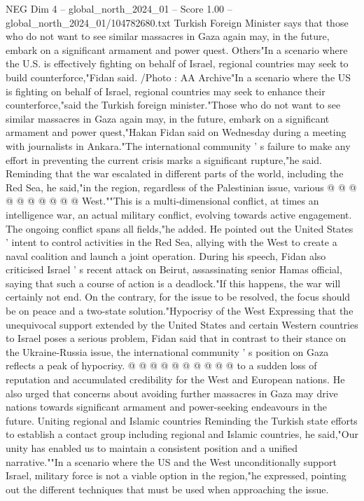 \begin{textsample}{NEG Dim 4 – global\_north\_2024\_01 – Score 1.00 – global\_north\_2024\_01/104782680.txt}  \label{ex:f4_neg_128}
Turkish Foreign Minister says that those who do not want to see similar massacres in Gaza again may, in the future, embark on a significant armament and power quest.
Others"In a scenario where the U.S. is effectively fighting on behalf of Israel, regional countries may seek to build counterforce,"Fidan said. /Photo : AA Archive"In a scenario where the US is fighting on behalf of Israel, regional countries may seek to enhance their counterforce,"said the Turkish foreign minister."Those who do not want to see similar massacres in Gaza again may, in the future, embark on a significant armament and power quest,"Hakan Fidan said on Wednesday during a meeting with journalists in Ankara."The international community ' s failure to make any effort in preventing the current crisis marks a significant rupture,"he said.
Reminding that the war escalated in different parts of the world, including the Red Sea, he said,"in the region, regardless of the Palestinian issue, various @ @ @ @ @ @ @ @ @ @ West.""This is a multi-dimensional conflict, at times an intelligence war, an actual military conflict, evolving towards active engagement.
The ongoing conflict spans all fields,"he added.
He pointed out the United States ' intent to control activities in the Red Sea, allying with the West to create a naval coalition and launch a joint operation.
During his speech, Fidan also criticised Israel ' s recent attack on Beirut, assassinating senior Hamas official, saying that such a course of action is a deadlock."If this happens, the war will certainly not end.
On the contrary, for the issue to be resolved, the focus should be on peace and a two-state solution."Hypocrisy of the West Expressing that the unequivocal support extended by the United States and certain Western countries to Israel poses a serious problem, Fidan said that in contrast to their stance on the Ukraine-Russia issue, the international community ' s position on Gaza reflects a peak of hypocrisy. @ @ @ @ @ @ @ @ @ @ to a sudden loss of reputation and accumulated credibility for the West and European nations.
He also urged that concerns about avoiding further massacres in Gaza may drive nations towards significant armament and power-seeking endeavours in the future.
Uniting regional and Islamic countries Reminding the Turkish state efforts to establish a contact group including regional and Islamic countries, he said,"Our unity has enabled us to maintain a consistent position and a unified narrative.""In a scenario where the US and the West unconditionally support Israel, military force is not a viable option in the region,"he expressed, pointing out the different techniques that must be used when approaching the issue.

\end{textsample}
